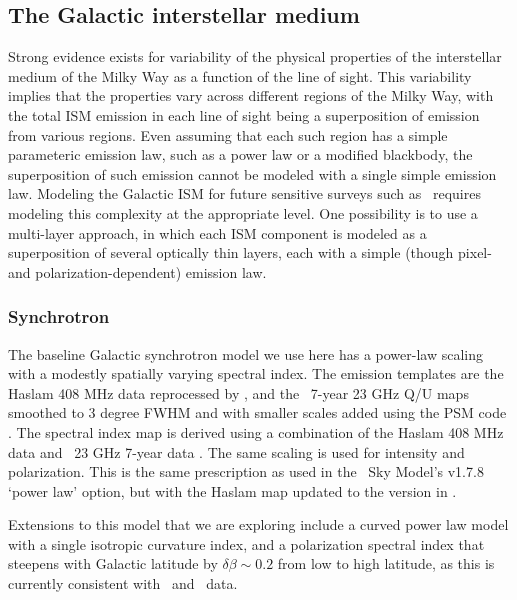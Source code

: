 \subsection{The Galactic interstellar medium}

Strong evidence exists for variability of the physical properties of the interstellar medium of the Milky Way as a function of the line of sight. This variability implies that the properties vary across different regions of the Milky Way, with the total ISM emission in each line of sight being a superposition of emission from various regions. Even assuming that each such region has a simple parameteric emission law, such as a power law or a modified blackbody, the superposition of such emission cannot be modeled with a single simple emission law. Modeling the Galactic ISM for future sensitive surveys such as \cmbexp\ requires  modeling  this complexity at the appropriate level. One possibility is to use a multi-layer approach, in which each ISM component is modeled as a superposition of several optically thin layers, each with a simple (though pixel- and polarization-dependent) emission law.

\subsubsection{Synchrotron}

The baseline Galactic synchrotron model we use here has a power-law scaling with a modestly spatially varying spectral index.  The emission templates are the Haslam 408 MHz data reprocessed by \cite{Remazeilles:2015hpa}, 
and the \wmap\ 7-year 23 GHz Q/U maps \cite{Jarosik:2010iu}
smoothed to 3 degree FWHM and with smaller scales added using the PSM code \cite{Delabrouille:2012ye}.
The spectral index map is derived using a combination of the Haslam 
408 MHz data \cite{Haslam:1981aa} and \wmap\ 23 GHz 7-year data \cite{MivilleDeschenes:2008hn}.
The same scaling is used for intensity and polarization.  This is the same prescription as used in the \planck\ Sky Model's v1.7.8 `power law' option, but with the Haslam map updated to the version in \cite{Remazeilles:2015hpa}.

Extensions to this model that we are exploring include a curved power 
law model with a single isotropic curvature index, and a polarization spectral index that steepens with Galactic latitude by $\delta \beta \sim 0.2$ from low to high latitude, as this is currently consistent with \wmap\ and \planck\ data. 

